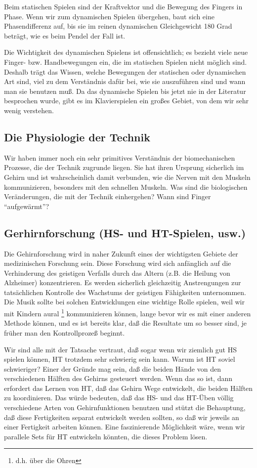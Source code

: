Beim statischen Spielen sind der Kraftvektor und die Bewegung des Fingers in Phase.
Wenn wir zum dynamischen Spielen übergehen, baut sich eine Phasendifferenz auf, bis sie im reinen dynamischen Gleichgewicht 180 Grad beträgt, wie es beim Pendel der Fall ist.

Die Wichtigkeit des dynamischen Spielens ist offensichtlich; es bezieht viele neue Finger- bzw. Handbewegungen ein, die im statischen Spielen nicht möglich sind.
Deshalb trägt das Wissen, welche Bewegungen der statischen oder dynamischen Art sind, viel zu dem Verständnis dafür bei, wie sie auszuführen sind und wann man sie benutzen muß.
Da das dynamische Spielen bis jetzt nie in der Literatur besprochen wurde, gibt es im Klavierspielen ein großes Gebiet, von dem wir sehr wenig verstehen.


\subsection{Die Physiologie der Technik}
\label{c1iv6b}

Wir haben immer noch ein sehr primitives Verständnis der biomechanischen Prozesse, die der Technik zugrunde liegen.
Sie hat ihren Ursprung sicherlich im Gehirn und ist wahrscheinlich damit verbunden, wie die Nerven mit den Muskeln kommunizieren, besonders mit den schnellen Muskeln.
Was sind die biologischen Veränderungen, die mit der Technik einhergehen?
Wann sind Finger \enquote{aufgewärmt}?


\subsection{Gerhirnforschung (HS- und HT-Spielen, usw.)}
\label{c1iv6c}

Die Gehirnforschung wird in naher Zukunft eines der wichtigsten Gebiete der medizinischen Forschung sein.
Diese Forschung wird sich anfänglich auf die Verhinderung des geistigen Verfalls durch das Altern (z.B. die Heilung von Alzheimer) konzentrieren.
Es werden sicherlich gleichzeitig Anstrengungen zur tatsächlichen Kontrolle des Wachstums der geistigen Fähigkeiten unternommen.
Die Musik sollte bei solchen Entwicklungen eine wichtige Rolle spielen, weil wir mit Kindern aural \footnote{d.h. über die Ohren} kommunizieren können, lange bevor wir es mit einer anderen Methode können, und es ist bereits klar, daß die Resultate um so besser sind, je früher man den Kontrollprozeß beginnt.

Wir sind alle mit der Tatsache vertraut, daß sogar wenn wir ziemlich gut HS spielen können, HT trotzdem sehr schwierig sein kann.
Warum ist HT soviel schwieriger?
Einer der Gründe mag sein, daß die beiden Hände von den verschiedenen Hälften des Gehirns gesteuert werden.
Wenn das so ist, dann erfordert das Lernen von HT, daß das Gehirn Wege entwickelt, die beiden Hälften zu koordinieren.
Das würde bedeuten, daß das HS- und das HT-Üben völlig verschiedene Arten von Gehirnfunktionen benutzen und stützt die Behauptung, daß diese Fertigkeiten separat entwickelt werden sollten, so daß wir jeweils an einer Fertigkeit arbeiten können.
Eine faszinierende Möglichkeit wäre, wenn wir parallele Sets für HT entwickeln könnten, die dieses Problem lösen.


